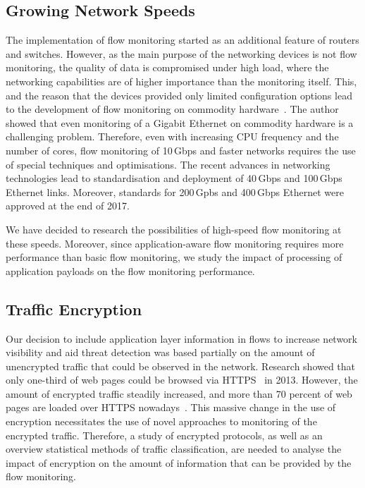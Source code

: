 \subsection{Growing Network Speeds}

The implementation of flow monitoring started as an additional feature of routers and switches. However, as the main purpose of the networking devices is not flow monitoring, the quality of data is compromised under high load, where the networking capabilities are of higher importance than the monitoring itself. This, and the reason that the devices provided only limited configuration options lead to the development of flow monitoring on commodity hardware~\cite{Deri-2003-Passively}. The author showed that even monitoring of a Gigabit Ethernet on commodity hardware is a challenging problem. Therefore, even with increasing CPU frequency and the number of cores, flow monitoring of 10\,Gbps and faster networks requires the use of special techniques and optimisations. The recent advances in networking technologies lead to standardisation and deployment of 40\,Gbps and 100\,Gbps Ethernet links. Moreover, standards for 200\,Gpbs and 400\,Gbps Ethernet were approved at the end of 2017.

We have decided to research the possibilities of high-speed flow monitoring at these speeds. Moreover, since application-aware flow monitoring requires more performance than basic flow monitoring, we study the impact of processing of application payloads on the flow monitoring performance.
\subsection{Traffic Encryption}

Our decision to include application layer information in flows to increase network visibility and aid threat detection was based partially on the amount of unencrypted traffic that could be observed in the network. Research showed that only one-third of web pages could be browsed via HTTPS~\cite{Vratonjic-2013-Inconvenient} in 2013. However, the amount of encrypted traffic steadily increased, and more than 70 percent of web pages are loaded over HTTPS nowadays~\cite{ISRG-2018-Lets}. This massive change in the use of encryption necessitates the use of novel approaches to monitoring of the encrypted traffic. Therefore, a study of encrypted protocols, as well as an overview statistical methods of traffic classification, are needed to analyse the impact of encryption on the amount of information that can be provided by the flow monitoring.

